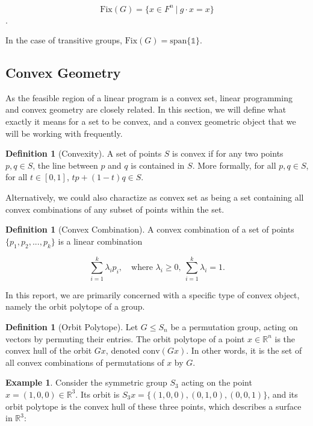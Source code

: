 \documentclass[11pt]{article} %
\theoremstyle{definition}
\newtheorem{definition}[theorem]{Definition}
\newtheorem*{example}{Example}
\theoremstyle{remark}
\newcommand{\RR}{\mathbb{R}}
\newcommand{\myspan}[1]{\textrm{span} \lbrace {#1} \rbrace}
\begin{document}
\[ \textrm{Fix}(G) = \lbrace x \in F^n \ | \ g \cdot x = x \rbrace \]. 

In the case of transitive groups, $\textrm{Fix}(G) = \myspan{\mathds{1}}$.

\subsection{Convex Geometry}

As the feasible region of a linear program is a convex set, linear programming and convex geometry are closely related. In this section, we will define what exactly it means for a set to be convex, and a convex geometric object that we will be working with frequently.

\begin{definition}[Convexity]
A set of points $S$ is convex if for any two points $p, q \in S$, the line between $p$ and $q$ is contained in $S$. More formally, for all $p, q \in S$, for all $t \in [0, 1]$, $tp + (1-t)q \in S$.
\end{definition}

Alternatively, we could also charactize as convex set as being a set containing all convex combinations of any subset of points within the set.

\begin{definition}[Convex Combination]
A convex combination of a set of points $\lbrace p_1, p_2, ..., p_k \rbrace$ is a linear combination

\[ \sum_{i = 1}^{k} \lambda_i p_i, \quad \textrm{where } \lambda_i \geq 0, \ \sum_{i=1}^{k} \lambda_i = 1. \]

\end{definition}

In this report, we are primarily concerned with a specific type of convex object, namely the orbit polytope of a group.

\begin{definition}[Orbit Polytope]
Let $G \leq S_n$ be a permutation group, acting on vectors by permuting their entries. The orbit polytope of a point $x \in \RR^n$ is the convex hull of the orbit $Gx$, denoted $\textrm{conv}(Gx)$. In other words, it is the set of all convex combinations of permutations of $x$ by $G$.
\end{definition}

\begin{example} Consider the symmetric group $S_3$ acting on the point $x = (1, 0, 0) \in \RR^3$. Its orbit is $S_3 x = \lbrace (1, 0, 0), (0, 1, 0), (0, 0, 1) \rbrace$, and its orbit polytope is the convex hull of these three points, which describes a surface in $\RR^3$:

\begin{figure}[h]
\centering
{}
\end{figure}
\end{example}
\end{document}
